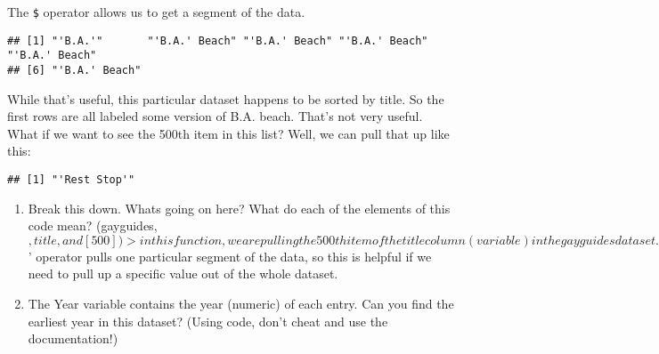\documentclass[
]{article}
\newenvironment{Shaded}{\begin{snugshade}}{\end{snugshade}}
\newcommand{\DecValTok}[1]{\textcolor[rgb]{0.00,0.00,0.81}{#1}}
\newcommand{\FunctionTok}[1]{\textcolor[rgb]{0.00,0.00,0.00}{#1}}
\newcommand{\NormalTok}[1]{#1}
\newcommand{\SpecialCharTok}[1]{\textcolor[rgb]{0.00,0.00,0.00}{#1}}
\begin{document}
The \texttt{\$} operator allows us to get a segment of the data.

\begin{Shaded}
\end{Shaded}

\begin{verbatim}
## [1] "'B.A.'"       "'B.A.' Beach" "'B.A.' Beach" "'B.A.' Beach" "'B.A.' Beach"
## [6] "'B.A.' Beach"
\end{verbatim}

While that's useful, this particular dataset happens to be sorted by
title. So the first rows are all labeled some version of B.A. beach.
That's not very useful. What if we want to see the 500th item in this
list? Well, we can pull that up like this:

\begin{Shaded}
\end{Shaded}

\begin{verbatim}
## [1] "'Rest Stop'"
\end{verbatim}

\begin{enumerate}
\def\labelenumi{(\arabic{enumi})}
\setcounter{enumi}{22}
\item
  Break this down. Whats going on here? What do each of the elements of
  this code mean? (gayguides,
  \(, title, and [500]) > in this function, we are pulling the 500th item of the title column (variable) in the gayguides dataset. The '\)'
  operator pulls one particular segment of the data, so this is helpful
  if we need to pull up a specific value out of the whole dataset.
\item
  The Year variable contains the year (numeric) of each entry. Can you
  find the earliest year in this dataset? (Using code, don't cheat and
  use the documentation!)
\end{enumerate}

\begin{Shaded}
\end{Shaded}
\end{document}
